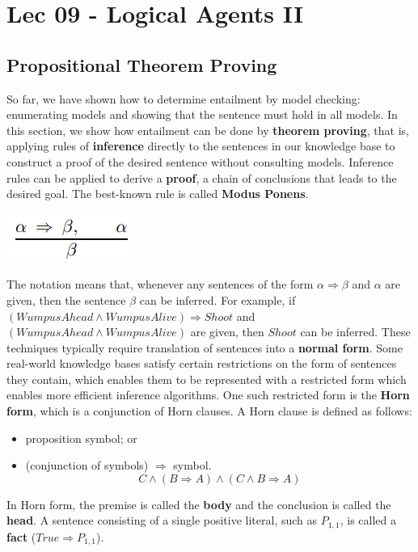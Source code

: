 \chapter{Lec 09 - Logical Agents II}
\section{Propositional Theorem Proving}
So far, we have shown how to determine entailment by model checking: enumerating models and showing that the sentence must hold in all models. In this section, we show how entailment can be done by \textbf{theorem proving}, that is, applying rules of \textbf{inference} directly to the sentences in our knowledge base to construct a proof of the desired  sentence without consulting models. 
\newline\newline
Inference rules can be applied to derive a \textbf{proof}, a chain of conclusions that leads to the desired goal. The best-known rule is called \textbf{Modus Ponens}.
\begin{center}
    \includegraphics[]{images/modus-ponens.png}
\end{center}
The notation means that, whenever any sentences of the form $\alpha \Rightarrow \beta$ and $\alpha$ are given, then the sentence $\beta$ can be inferred. For example, if $(WumpusAhead \land WumpusAlive) \Rightarrow Shoot$ and $(WumpusAhead \land WumpusAlive)$ are given, then $Shoot$ can be inferred. These techniques typically require translation of sentences into a \textbf{normal form}.
\newline\newline
Some real-world knowledge bases satisfy certain restrictions on the form of sentences they contain, which enables them to be represented with a restricted form which enables more efficient inference algorithms. One such restricted form is the \textbf{Horn form}, which is a conjunction of Horn clauses. A Horn clause is defined as follows:
\begin{itemize}
    \item proposition symbol; or
    \item (conjunction of symbols) $\Rightarrow$ symbol.
    \[C \land (B \Rightarrow A) \land (C \land B \Rightarrow A)\]
\end{itemize}
In Horn form, the premise is called the \textbf{body} and the conclusion is called the \textbf{head}. A sentence consisting of a single positive literal, such as $P_{1,1}$, is called a \textbf{fact} ($True \Rightarrow P_{1,1}$).\newline\newline
